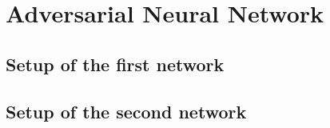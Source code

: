 \chapter{Adversarial Neural Network}
\label{chp:ANN}
\section{Setup of the first network}
\section{Setup of the second network}
